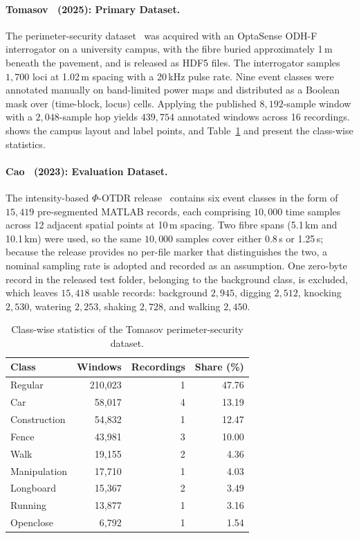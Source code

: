 \paragraph[Tomasov \etal\ (2025): Primary Dataset]{Tomasov \etal\ (2025): Primary Dataset.}
The perimeter-security dataset~\cite{tomasov2025dataset} was acquired with an OptaSense ODH-F interrogator on a university campus, with the fibre buried approximately 1\,m beneath the pavement, and is released as HDF5 files. The interrogator samples $1{,}700$ loci at 1.02\,m spacing with a 20\,kHz pulse rate. Nine event classes were annotated manually on band-limited power maps and distributed as a Boolean mask over (time-block, locus) cells. Applying the published $8{,}192$-sample window with a $2{,}048$-sample hop yields $439{,}754$ annotated windows across 16 recordings.  shows the campus layout and label points, and Table~\ref{tab:dataset} and  present the class-wise statistics.

\paragraph[Cao \etal\ (2023): Evaluation Dataset]{Cao \etal\ (2023): Evaluation Dataset.}
The intensity-based $\Phi$-OTDR release~\cite{caoxin2023opendataset} contains six event classes in the form of $15{,}419$ pre-segmented MATLAB records, each comprising $10{,}000$ time samples across 12 adjacent spatial points at 10\,m spacing. Two fibre spans (5.1\,km and 10.1\,km) were used, so the same $10{,}000$ samples cover either 0.8\,s or 1.25\,s; because the release provides no per-file marker that distinguishes the two, a nominal sampling rate is adopted and recorded as an assumption. One zero-byte record in the released test folder, belonging to the background class, is excluded, which leaves $15{,}418$ usable records: background $2{,}945$, digging $2{,}512$, knocking $2{,}530$, watering $2{,}253$, shaking $2{,}728$, and walking $2{,}450$.

\begin{table}[!htbp]
	\centering
	\caption{Class-wise statistics of the Tomasov perimeter-security dataset.}
	\label{tab:dataset}
	\small
	\begin{tabular}{@{}lrrr@{}}
		\toprule
		\textbf{Class} & \textbf{Windows} & \textbf{Recordings} & \textbf{Share (\%)}\\
		\midrule
		Regular      & 210{,}023 & 1 & 47.76\\
		Car          & 58{,}017  & 4 & 13.19\\
		Construction & 54{,}832  & 1 & 12.47\\
		Fence        & 43{,}981  & 3 & 10.00\\
		Walk         & 19{,}155  & 2 & 4.36\\
		Manipulation & 17{,}710  & 1 & 4.03\\
		Longboard    & 15{,}367  & 2 & 3.49\\
		Running      & 13{,}877  & 1 & 3.16\\
		Openclose    & 6{,}792   & 1 & 1.54\\
		\bottomrule
	\end{tabular}
\end{table}

